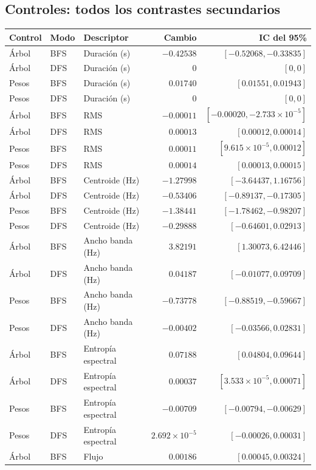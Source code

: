 \documentclass[11pt,a4paper]{article}
\begin{document}
\subsection{Controles: todos los contrastes secundarios}
{\small\setlength{\tabcolsep}{5pt}
\begin{longtable}{lllrr}
\toprule
Control & Modo & Descriptor & Cambio & IC del 95\% \\
\midrule\endhead
Árbol & BFS & Duración (s) & $-0.42538$ & $[-0.52068, -0.33835]$ \\
Árbol & DFS & Duración (s) & $0$ & $[0, 0]$ \\
Pesos & BFS & Duración (s) & $0.01740$ & $[0.01551, 0.01943]$ \\
Pesos & DFS & Duración (s) & $0$ & $[0, 0]$ \\
Árbol & BFS & RMS & $-0.00011$ & $[-0.00020, -2.733\times10^{-5}]$ \\
Árbol & DFS & RMS & $0.00013$ & $[0.00012, 0.00014]$ \\
Pesos & BFS & RMS & $0.00011$ & $[9.615\times10^{-5}, 0.00012]$ \\
Pesos & DFS & RMS & $0.00014$ & $[0.00013, 0.00015]$ \\
Árbol & BFS & Centroide (Hz) & $-1.27998$ & $[-3.64437, 1.16756]$ \\
Árbol & DFS & Centroide (Hz) & $-0.53406$ & $[-0.89137, -0.17305]$ \\
Pesos & BFS & Centroide (Hz) & $-1.38441$ & $[-1.78462, -0.98207]$ \\
Pesos & DFS & Centroide (Hz) & $-0.29888$ & $[-0.64601, 0.02913]$ \\
Árbol & BFS & Ancho banda (Hz) & $3.82191$ & $[1.30073, 6.42446]$ \\
Árbol & DFS & Ancho banda (Hz) & $0.04187$ & $[-0.01077, 0.09709]$ \\
Pesos & BFS & Ancho banda (Hz) & $-0.73778$ & $[-0.88519, -0.59667]$ \\
Pesos & DFS & Ancho banda (Hz) & $-0.00402$ & $[-0.03566, 0.02831]$ \\
Árbol & BFS & Entropía espectral & $0.07188$ & $[0.04804, 0.09644]$ \\
Árbol & DFS & Entropía espectral & $0.00037$ & $[3.533\times10^{-5}, 0.00071]$ \\
Pesos & BFS & Entropía espectral & $-0.00709$ & $[-0.00794, -0.00629]$ \\
Pesos & DFS & Entropía espectral & $2.692\times10^{-5}$ & $[-0.00026, 0.00031]$ \\
Árbol & BFS & Flujo & $0.00186$ & $[0.00045, 0.00324]$ \\

\end{longtable}}
\end{document}
